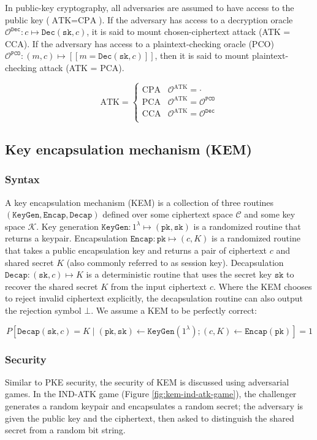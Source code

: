\documentclass[runningheads]{llncs}
\newcommand{\keygen}{\texttt{KeyGen}}
\newcommand{\decrypt}{\texttt{Dec}}
\newcommand{\encap}{\texttt{Encap}}
\newcommand{\decap}{\texttt{Decap}}
\newcommand{\pk}{\texttt{pk}}
\newcommand{\sk}{\texttt{sk}}
\newcommand{\pco}{\texttt{PCO}}
\newcommand{\llbrack}{[\![}
\newcommand{\rrbrack}{]\!]}
\begin{document}
In public-key cryptography, all adversaries are assumed to have access to the public key ($\text{ATK} = \text{CPA}$). If the adversary has access to a decryption oracle $\mathcal{O}^\decrypt: c \mapsto \decrypt(\sk, c)$, it is said to mount chosen-ciphertext attack (ATK = CCA). If the adversary has access to a plaintext-checking oracle (PCO) $\mathcal{O}^\pco: (m, c) \mapsto \llbrack m = \decrypt(\sk, c)\rrbrack$, then it is said to mount plaintext-checking attack (ATK = PCA).

\begin{equation*}
    \text{ATK} = \begin{cases}
        \text{CPA} & \mathcal{O}^\text{ATK} = \cdot \\
        \text{PCA} & \mathcal{O}^\text{ATK} = \mathcal{O}^\pco \\
        \text{CCA} & \mathcal{O}^\text{ATK} = \mathcal{O}^\decrypt \\
    \end{cases}
\end{equation*}

\subsection{Key encapsulation mechanism (KEM)}\label{sec:key-encapsulation-mechanism}
\subsubsection{Syntax} A key encapsulation mechanism (KEM) is a collection of three routines $(\keygen, \encap, \decap)$ defined over some ciphertext space $\mathcal{C}$ and some key space $\mathcal{K}$. Key generation $\keygen: 1^\lambda \mapsto (\pk, \sk)$ is a randomized routine that returns a keypair. Encapsulation $\encap: \pk \mapsto (c, K)$ is a randomized routine that takes a public encapsulation key and returns a pair of ciphertext $c$ and shared secret $K$ (also commonly referred to as session key). Decapsulation $\decap: (\sk, c) \mapsto K$ is a deterministic routine that uses the secret key $\sk$ to recover the shared secret $K$ from the input ciphertext $c$. Where the KEM chooses to reject invalid ciphertext explicitly, the decapsulation routine can also output the rejection symbol $\bot$. We assume a KEM to be perfectly correct:

$$
P\left[
    \decap(\sk, c) = K \mid (\pk, \sk) \leftarrow \keygen(1^\lambda); (c, K) \leftarrow \encap(\pk)
\right] = 1
$$

\subsubsection{Security} Similar to PKE security, the security of KEM is discussed using adversarial games. In the IND-ATK game (Figure \ref{fig:kem-ind-atk-game}), the challenger generates a random keypair and encapsulates a random secret; the adversary is given the public key and the ciphertext, then asked to distinguish the shared secret from a random bit string.
\end{document}
